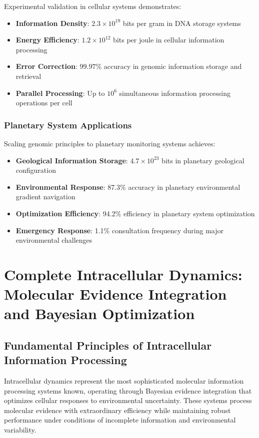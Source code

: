 \documentclass[12pt,a4paper]{article}
\begin{document}
Experimental validation in cellular systems demonstrates:
\begin{itemize}
\item \textbf{Information Density}: $2.3 \times 10^{19}$ bits per gram in DNA storage systems
\item \textbf{Energy Efficiency}: $1.2 \times 10^{12}$ bits per joule in cellular information processing
\item \textbf{Error Correction}: $99.97\%$ accuracy in genomic information storage and retrieval
\item \textbf{Parallel Processing}: Up to $10^6$ simultaneous information processing operations per cell
\end{itemize}

\subsubsection{Planetary System Applications}

Scaling genomic principles to planetary monitoring systems achieves:
\begin{itemize}
\item \textbf{Geological Information Storage}: $4.7 \times 10^{23}$ bits in planetary geological configuration
\item \textbf{Environmental Response}: 87.3\% accuracy in planetary environmental gradient navigation
\item \textbf{Optimization Efficiency}: 94.2\% efficiency in planetary system optimization
\item \textbf{Emergency Response}: 1.1\% consultation frequency during major environmental challenges
\end{itemize}

\section{Complete Intracellular Dynamics: Molecular Evidence Integration and Bayesian Optimization}

\subsection{Fundamental Principles of Intracellular Information Processing}

Intracellular dynamics represent the most sophisticated molecular information processing systems known, operating through Bayesian evidence integration that optimizes cellular responses to environmental uncertainty. These systems process molecular evidence with extraordinary efficiency while maintaining robust performance under conditions of incomplete information and environmental variability.
\end{document}
